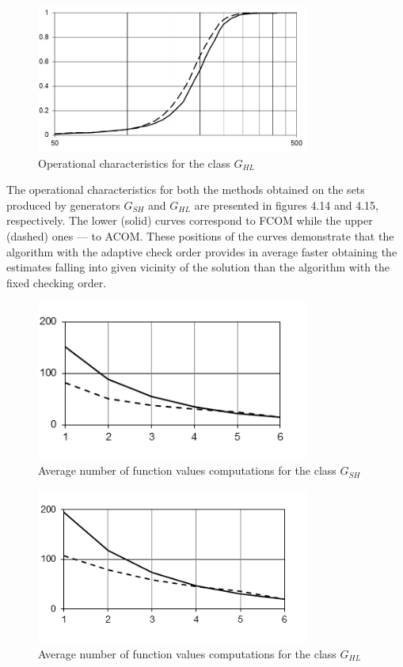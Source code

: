 \documentclass[graybox]{svmult}
\begin{document}
\begin{figure}[h]
  \label{fig:4_15}
  \centering
  \includegraphics[width=0.8\textwidth]{figures/4_15.png}
  \caption{Operational characteristics for the class $G_{HL}$}
\end{figure}

The operational characteristics for both the methods obtained on the sets produced by generators $G_{SH}$ and $G_{HL}$ are presented in figures 4.14 and 4.15, respectively. The lower (solid) curves correspond to FCOM while the upper (dashed) ones --- to ACOM. These positions of the curves demonstrate that the algorithm with the adaptive check order provides in average faster obtaining the estimates falling into given vicinity of the solution than the algorithm with the fixed checking order.

\begin{figure}[h]
  \label{fig:4_16}
  \centering
  \includegraphics[width=0.8\textwidth]{figures/4_16.png}
  \caption{Average number of function values computations for the class $G_{SH}$}
\end{figure}

\begin{figure}[h]
  \label{fig:4_17}
  \centering
  \includegraphics[width=0.8\textwidth]{figures/4_17.png}
  \caption{Average number of function values computations for the class $G_{HL}$}
\end{figure}
\end{document}
